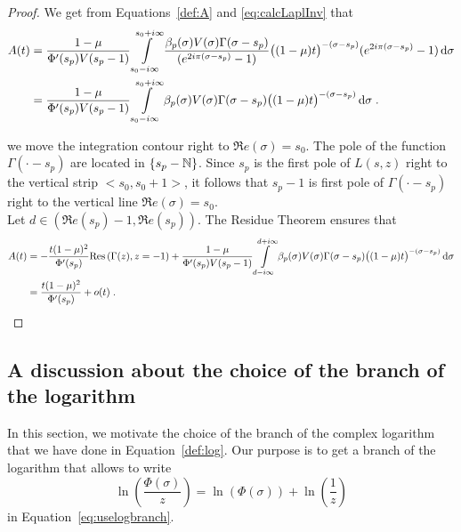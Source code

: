 \documentclass[11pt]{amsart}
\renewcommand{\Re}{\mathfrak{R}e}
\newcommand{\diff}{\,\mathrm{d}}
\newcommand{\res}{\mathrm{Res}\,}
\begin{document}
\begin{lemma}
    
\end{lemma}
\begin{proof}We get from Equations~\eqref{def:A} and \eqref{eq:calcLaplInv} that 
\begin{subequations}
    \begin{align}
    A(t) 
    &=
    \frac{1-\mu}{\Phi'(s_p) V(s_p-1)}
     \int\limits_{s_0-i\infty}^{s_0+i\infty}
     \frac{\beta_p(\sigma) V(\sigma)\Gamma(\sigma-s_p)
  }{(e^{2i\pi(\sigma-s_p)}-1)} \big((1-\mu)t\big)^{-(\sigma-s_p)}(e^{2i\pi(\sigma-s_p)}-1) \diff \sigma  \\
  &=  
   \frac{1-\mu}{\Phi'(s_p) V(s_p-1)}
     \int\limits_{s_0-i\infty}^{s_0+i\infty}
     \beta_p(\sigma) V(\sigma)
   \Gamma(\sigma-s_p)\big((1-\mu)t\big)^{-(\sigma-s_p)} \diff \sigma
  \eqfinp
\end{align}
\end{subequations}

we move the integration contour right to $\Re(\sigma) = s_0$. The pole of the function $\Gamma(\cdot-s_p)$ are located in $\{s_p - \mathbb{N}\}$. Since $s_p$ is the first pole of $L(s,z)$ right to the vertical strip $<s_0, s_0+1>$, it follows that $s_p-1$ is first pole of $\Gamma(\cdot-s_p)$ right to the vertical line $\Re(\sigma) = s_0$. \\

Let $d \in (\Re(s_p)-1,\Re(s_p))$. The Residue Theorem ensures that 
\begin{align*}
    A(t) 
    &=  - \frac{t(1-\mu)^2}{\Phi'(s_p)} \res(\Gamma(z), z = -1) +   \frac{1-\mu}{\Phi'(s_p) V(s_p-1)}
     \int\limits_{d-i\infty}^{d+i\infty}
     \beta_p(\sigma) V(\sigma)
   \Gamma(\sigma-s_p)\big((1-\mu)t\big)^{-(\sigma-s_p)} \diff \sigma \\
   &=  \frac{t(1-\mu)^2}{\Phi'(s_p)} + o(t)
  \eqfinp
\end{align*}
\end{proof}


\subsection{A discussion about the choice of the branch of the logarithm}
In this section, we motivate the choice of the branch of the complex logarithm that we have done in Equation~\eqref{def:log}. Our purpose is to get a branch of the logarithm that allows to write 
    $$ \ln(\frac{\Phi(\sigma)}{z}) = \ln(\Phi(\sigma)) + \ln(\frac{1}{z})$$
in Equation~\eqref{eq:uselogbranch}. \\
\end{document}
